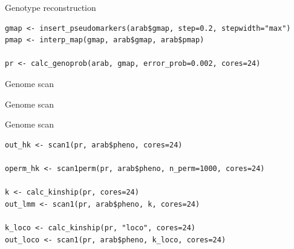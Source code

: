 \documentclass[12pt,t,aspectratio=1610]{beamer}
\begin{document}
\begin{frame}[c,fragile]{Genotype reconstruction}

\begin{center} \begin{minipage}[c]{11.5cm} \begin{semiverbatim}
\begin{lstlisting}[linewidth=11.5cm]
gmap <- insert_pseudomarkers(arab$gmap, step=0.2, stepwidth="max")
pmap <- interp_map(gmap, arab$gmap, arab$pmap)

pr <- calc_genoprob(arab, gmap, error_prob=0.002, cores=24)
\end{lstlisting}
\end{semiverbatim} \end{minipage} \end{center}

\end{frame}



\begin{frame}[c]{Genome scan}


\end{frame}

\begin{frame}[c]{Genome scan}


\end{frame}


\begin{frame}[c,fragile]{Genome scan}

\begin{center} \begin{minipage}[c]{11.3cm} \begin{semiverbatim}
\begin{lstlisting}[linewidth=11.3cm]
out_hk <- scan1(pr, arab$pheno, cores=24)

operm_hk <- scan1perm(pr, arab$pheno, n_perm=1000, cores=24)

k <- calc_kinship(pr, cores=24)
out_lmm <- scan1(pr, arab$pheno, k, cores=24)

k_loco <- calc_kinship(pr, "loco", cores=24)
out_loco <- scan1(pr, arab$pheno, k_loco, cores=24)
\end{lstlisting}
\end{semiverbatim} \end{minipage} \end{center}

\end{frame}
\end{document}
